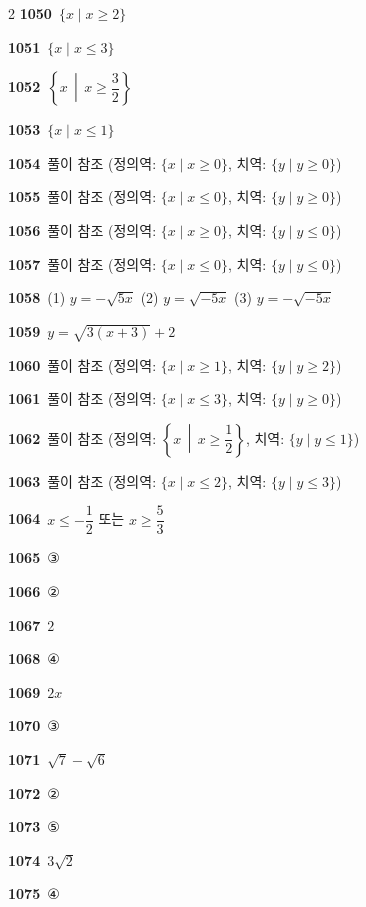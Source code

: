 \documentclass[10pt,a4paper]{article}
\begin{document}
\begin{multicols}{2}
\noindent\textbf{1050}\ $\{x \mid x\ge 2\}$\par
\noindent\textbf{1051}\ $\{x \mid x\le 3\}$\par
\noindent\textbf{1052}\ $\left\{x \,\middle|\, x\ge \dfrac{3}{2}\right\}$\par
\noindent\textbf{1053}\ $\{x \mid x\le 1\}$\par
\noindent\textbf{1054}\ 풀이 참조 (정의역: $\{x \mid x\ge 0\}$, 치역: $\{y \mid y\ge 0\}$)\par
\noindent\textbf{1055}\ 풀이 참조 (정의역: $\{x \mid x\le 0\}$, 치역: $\{y \mid y\ge 0\}$)\par
\noindent\textbf{1056}\ 풀이 참조 (정의역: $\{x \mid x\ge 0\}$, 치역: $\{y \mid y\le 0\}$)\par
\noindent\textbf{1057}\ 풀이 참조 (정의역: $\{x \mid x\le 0\}$, 치역: $\{y \mid y\le 0\}$)\par
\noindent\textbf{1058}\ (1) $y=-\sqrt{5x}$ (2) $y=\sqrt{-5x}$ (3) $y=-\sqrt{-5x}$\par
\noindent\textbf{1059}\ $y=\sqrt{3(x+3)}+2$\par
\noindent\textbf{1060}\ 풀이 참조 (정의역: $\{x \mid x\ge 1\}$, 치역: $\{y \mid y\ge 2\}$)\par
\noindent\textbf{1061}\ 풀이 참조 (정의역: $\{x \mid x\le 3\}$, 치역: $\{y \mid y\ge 0\}$)\par
\noindent\textbf{1062}\ 풀이 참조 (정의역: $\left\{x \,\middle|\, x\ge \dfrac{1}{2}\right\}$, 치역: $\{y \mid y\le 1\}$)\par
\noindent\textbf{1063}\ 풀이 참조 (정의역: $\{x \mid x\le 2\}$, 치역: $\{y \mid y\le 3\}$)\par
\noindent\textbf{1064}\ $x\le -\dfrac{1}{2}$ 또는 $x\ge \dfrac{5}{3}$\par
\noindent\textbf{1065}\ ③\par
\noindent\textbf{1066}\ ②\par
\noindent\textbf{1067}\ $2$\par
\noindent\textbf{1068}\ ④\par
\noindent\textbf{1069}\ $2x$\par
\noindent\textbf{1070}\ ③\par
\noindent\textbf{1071}\ $\sqrt{7}-\sqrt{6}$\par
\noindent\textbf{1072}\ ②\par
\noindent\textbf{1073}\ ⑤\par
\noindent\textbf{1074}\ $3\sqrt{2}$\par
\noindent\textbf{1075}\ ④\par

\end{multicols}
\end{document}
